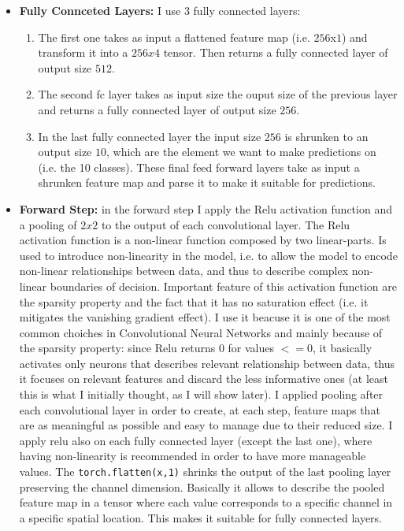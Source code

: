 \documentclass[a4paper]{article}
\begin{document}
\begin{itemize}
    \item \textbf{Fully Connceted Layers:} I use 3 fully connected layers:
    \begin{enumerate}
        \item The first one takes as input a flattened feature map (i.e. $256$x$1$) and transform it into a  $256 x 4$ tensor. Then returns a fully connected layer of output size $512$.
        \item The second fc layer takes as input size the ouput size of the previous layer and returns a fully connected layer of output size $256$.
        \item In the last fully connected layer the input size $256$ is shrunken to an output size $10$, which are the element we want to make predictions on (i.e. the 10 classes).
        These final feed forward layers take as input a shrunken feature map and parse it to make it suitable for predictions.
    \end{enumerate}
    \item \textbf{Forward Step: } in the forward step I apply the Relu activation function and a pooling of $2x2$ to the output of each convolutional layer. The Relu activation function is a non-linear function composed by two linear-parts. Is used to introduce non-linearity in the model, i.e. to allow the model to encode non-linear relationships between data, and thus to describe complex non-linear boundaries of decision. Important feature of this activation function are the sparsity property and the fact that it has no saturation effect (i.e. it mitigates the vanishing gradient effect). I use it beacuse it is one of the most common choiches in Convolutional Neural Networks and mainly because of the sparsity property: since Relu returns 0 for values $<=0$, it basically activates only neurons that describes relevant relationship between data, thus it focuses on relevant features and discard the less informative ones (at least this is what I initially thought, as I will show later). I applied pooling after each convolutional layer in order to create, at each step, feature maps that are as meaningful as possible and easy to manage due to their reduced size. I apply relu also on each fully connected layer (except the last one), where having non-linearity is recommended in order to have more manageable values. The \texttt{torch.flatten(x,1)} shrinks the output of the last pooling layer preserving the channel dimension. Basically it allows to describe the pooled feature map in a tensor  where each value corresponds to a specific channel in a specific spatial location. This makes it suitable for fully connected layers.  
\end{itemize}
\end{document}
